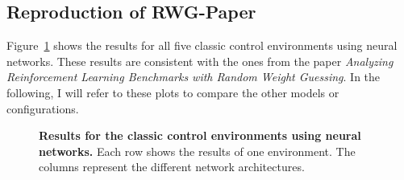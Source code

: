 \subsection{Reproduction of RWG-Paper}
Figure~\ref{fig:results_NN} shows the results for all five classic control environments using neural networks. These results are consistent with the ones from the paper \emph{Analyzing Reinforcement Learning Benchmarks with Random Weight Guessing}. In the following, I will refer to these plots to compare the other models or configurations.
\begin{figure}[!ht]
\begin{figrow}
\item \label{row:NN_CartPole}  
\item \label{row:NN_Acrobot}  
\item \label{row:NN_MountainCar}  
\item \label{row:NN_MountainCarCont}  
\item \label{row:NN_Pendulum}  
\end{figrow}
\caption[Results for the classic control environments using neural networks]{
  \textbf{Results for the classic control environments using neural networks.}
   Each row shows the results of one environment. The columns represent the different network architectures.
}
\label{fig:results_NN}
\end{figure}

